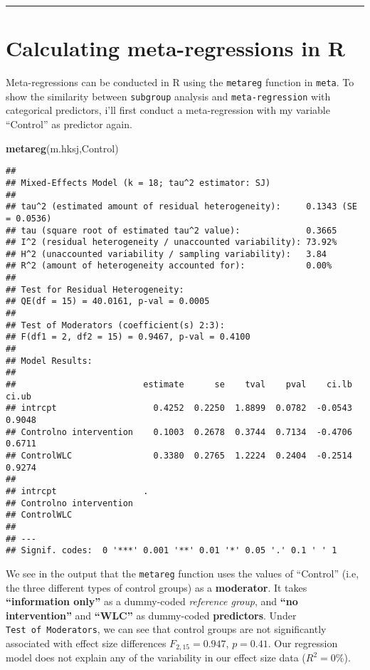 \documentclass[]{book}
\newenvironment{Shaded}{\begin{snugshade}}{\end{snugshade}}
\newcommand{\KeywordTok}[1]{\textcolor[rgb]{0.13,0.29,0.53}{\textbf{#1}}}
\newcommand{\NormalTok}[1]{#1}
\theoremstyle{definition}
\theoremstyle{definition}
\theoremstyle{definition}
\theoremstyle{remark}
\begin{document}
\begin{center}\rule{0.5\linewidth}{\linethickness}\end{center}

\section{Calculating meta-regressions in
R}\label{calculating-meta-regressions-in-r}

Meta-regressions can be conducted in R using the \texttt{metareg}
function in \texttt{meta}. To show the similarity between
\texttt{subgroup} analysis and \texttt{meta-regression} with categorical
predictors, i'll first conduct a meta-regression with my variable
``Control'' as predictor again.

\begin{Shaded}
\begin{Highlighting}[]
\KeywordTok{metareg}\NormalTok{(m.hksj,Control)}
\end{Highlighting}
\end{Shaded}

\begin{verbatim}
## 
## Mixed-Effects Model (k = 18; tau^2 estimator: SJ)
## 
## tau^2 (estimated amount of residual heterogeneity):     0.1343 (SE = 0.0536)
## tau (square root of estimated tau^2 value):             0.3665
## I^2 (residual heterogeneity / unaccounted variability): 73.92%
## H^2 (unaccounted variability / sampling variability):   3.84
## R^2 (amount of heterogeneity accounted for):            0.00%
## 
## Test for Residual Heterogeneity: 
## QE(df = 15) = 40.0161, p-val = 0.0005
## 
## Test of Moderators (coefficient(s) 2:3): 
## F(df1 = 2, df2 = 15) = 0.9467, p-val = 0.4100
## 
## Model Results:
## 
##                         estimate      se    tval    pval    ci.lb   ci.ub
## intrcpt                   0.4252  0.2250  1.8899  0.0782  -0.0543  0.9048
## Controlno intervention    0.1003  0.2678  0.3744  0.7134  -0.4706  0.6711
## ControlWLC                0.3380  0.2765  1.2224  0.2404  -0.2514  0.9274
##                          
## intrcpt                 .
## Controlno intervention   
## ControlWLC               
## 
## ---
## Signif. codes:  0 '***' 0.001 '**' 0.01 '*' 0.05 '.' 0.1 ' ' 1
\end{verbatim}

We see in the output that the \texttt{metareg} function uses the values
of ``Control'' (i.e, the three different types of control groups) as a
\textbf{moderator}. It takes \textbf{``information only''} as a
dummy-coded \emph{reference group}, and \textbf{``no intervention''} and
\textbf{``WLC''} as dummy-coded \textbf{predictors}. Under
\texttt{Test\ of\ Moderators}, we can see that control groups are not
significantly associated with effect size differences
\(F_{2,15}=0.947\), \(p=0.41\). Our regression model does not explain
any of the variability in our effect size data (\(R^2=0\%\)).
\end{document}
